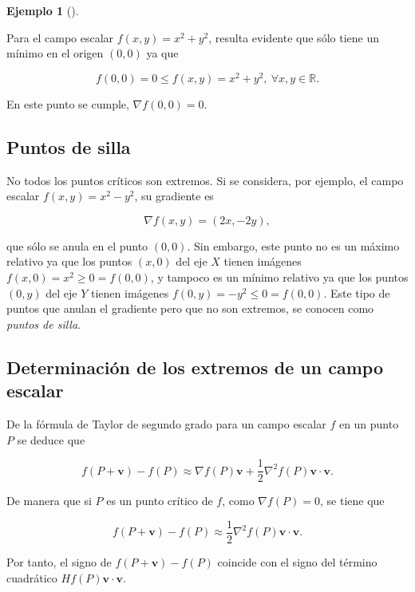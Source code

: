 \documentclass[
  a4paper,
]{scrreport}
\theoremstyle{plain}
\theoremstyle{plain}
\theoremstyle{definition}
\theoremstyle{definition}
\newtheorem{example}{Ejemplo}[chapter]
\theoremstyle{plain}
\theoremstyle{definition}
\theoremstyle{remark}
\begin{document}
\begin{example}[]\protect\hypertarget{exm-extremos-relativos}{}\label{exm-extremos-relativos}

Para el campo escalar \(f(x,y)=x^2+y^2\), resulta evidente que sólo
tiene un mínimo en el origen \((0,0)\) ya que

\[f(0,0)=0 \leq f(x,y)=x^2+y^2,\ \forall x,y\in \mathbb{R}.\]

En este punto se cumple, \(\nabla f(0,0) = 0\).

\end{example}

\hypertarget{puntos-de-silla}{%
\subsection{Puntos de silla}\label{puntos-de-silla}}

No todos los puntos críticos son extremos. Si se considera, por ejemplo,
el campo escalar \(f(x,y)=x^2-y^2\), su gradiente es

\[\nabla f(x,y) = (2x,-2y),\]

que sólo se anula en el punto \((0,0)\). Sin embargo, este punto no es
un máximo relativo ya que los puntos \((x,0)\) del eje \(X\) tienen
imágenes \(f(x,0)=x^2\geq 0=f(0,0)\), y tampoco es un mínimo relativo ya
que los puntos \((0,y)\) del eje \(Y\) tienen imágenes
\(f(0,y)=-y^2\leq 0=f(0,0)\). Este tipo de puntos que anulan el
gradiente pero que no son extremos, se conocen como \emph{puntos de
silla}.

\hypertarget{determinaciuxf3n-de-los-extremos-de-un-campo-escalar}{%
\subsection{Determinación de los extremos de un campo
escalar}\label{determinaciuxf3n-de-los-extremos-de-un-campo-escalar}}

De la fórmula de Taylor de segundo grado para un campo escalar \(f\) en
un punto \(P\) se deduce que

\[f(P+\mathbf{v})-f(P)\approx \nabla f(P)\mathbf{v}+\frac{1}{2}\nabla^2f(P)\mathbf{v}\cdot\mathbf{v}.\]

De manera que si \(P\) es un punto crítico de \(f\), como
\(\nabla f(P)=0\), se tiene que

\[f(P+\mathbf{v})-f(P)\approx \frac{1}{2}\nabla^2f(P)\mathbf{v}\cdot\mathbf{v}.\]

Por tanto, el signo de \(f(P+\mathbf{v})-f(P)\) coincide con el signo
del término cuadrático \(Hf(P)\mathbf{v}\cdot\mathbf{v}\).
\end{document}
